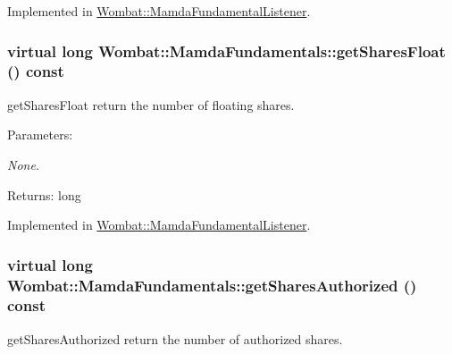 Implemented in \hyperlink{classWombat_1_1MamdaFundamentalListener_39395ed6d7896ff0d5ac8594199fbdc7}{Wombat::Mamda\-Fundamental\-Listener}.\hypertarget{classWombat_1_1MamdaFundamentals_64a2fc82594149b801ae5723479df55d}{
\subsubsection[getSharesFloat]{\setlength{\rightskip}{0pt plus 5cm}virtual long Wombat::Mamda\-Fundamentals::get\-Shares\-Float () const}}
\label{classWombat_1_1MamdaFundamentals_64a2fc82594149b801ae5723479df55d}


get\-Shares\-Float return the number of floating shares. 

\begin{Desc}
\item[Parameters:]
\begin{description}
\item[{\em None.}]\end{description}
\end{Desc}
\begin{Desc}
\item[Returns:]long\end{Desc}


Implemented in \hyperlink{classWombat_1_1MamdaFundamentalListener_4a4693aa809d7affdaeda70f34f002d7}{Wombat::Mamda\-Fundamental\-Listener}.\hypertarget{classWombat_1_1MamdaFundamentals_69967f29f8189a0e9775aa475568a5a7}{
\subsubsection[getSharesAuthorized]{\setlength{\rightskip}{0pt plus 5cm}virtual long Wombat::Mamda\-Fundamentals::get\-Shares\-Authorized () const}}
\label{classWombat_1_1MamdaFundamentals_69967f29f8189a0e9775aa475568a5a7}


get\-Shares\-Authorized return the number of authorized shares. 

